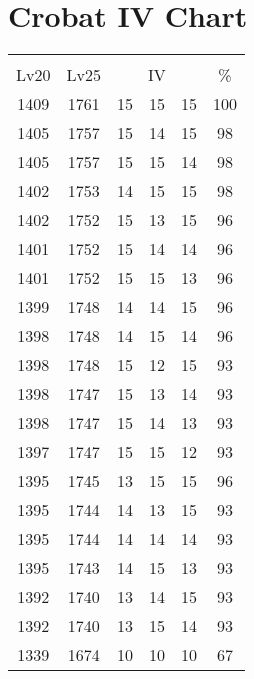 \documentclass{article}%
\begin{document}
%
\normalsize%
\section{Crobat IV Chart}%
\label{sec:Crobat IV Chart}%
\renewcommand{\arraystretch}{1.5}%
\begin{tabular}{|c|c|c|c|c|c|}%
\hline%
\multicolumn{6}{|c|}{\textcolor{white}{ 
\linebreak{Crobat}
}%
\cellcolor{black}}\\%
\multicolumn{1}{|c}{Lv20}&\multicolumn{1}{c|}{Lv25}&\multicolumn{3}{c|}{IV}&\multicolumn{1}{|c|}{\%}\\%
\hline%
\rowcolor{color100}%
1409&1761&15&15&15&100\\%
\hline%
\rowcolor{color98}%
1405&1757&15&14&15&98\\%
\hline%
\rowcolor{color98}%
1405&1757&15&15&14&98\\%
\hline%
\rowcolor{color98}%
1402&1753&14&15&15&98\\%
\hline%
\rowcolor{color96}%
1402&1752&15&13&15&96\\%
\hline%
\rowcolor{color96}%
1401&1752&15&14&14&96\\%
\hline%
\rowcolor{color96}%
1401&1752&15&15&13&96\\%
\hline%
\rowcolor{color96}%
1399&1748&14&14&15&96\\%
\hline%
\rowcolor{color96}%
1398&1748&14&15&14&96\\%
\hline%
\rowcolor{color93}%
1398&1748&15&12&15&93\\%
\hline%
\rowcolor{color93}%
1398&1747&15&13&14&93\\%
\hline%
\rowcolor{color93}%
1398&1747&15&14&13&93\\%
\hline%
\rowcolor{color93}%
1397&1747&15&15&12&93\\%
\hline%
\rowcolor{color96}%
1395&1745&13&15&15&96\\%
\hline%
\rowcolor{color93}%
1395&1744&14&13&15&93\\%
\hline%
\rowcolor{color93}%
1395&1744&14&14&14&93\\%
\hline%
\rowcolor{color93}%
1395&1743&14&15&13&93\\%
\hline%
\rowcolor{color93}%
1392&1740&13&14&15&93\\%
\hline%
\rowcolor{color93}%
1392&1740&13&15&14&93\\%
\hline%
\rowcolor{color91}%
1339&1674&10&10&10&67\\%
\end{tabular}

%
\end{document}
